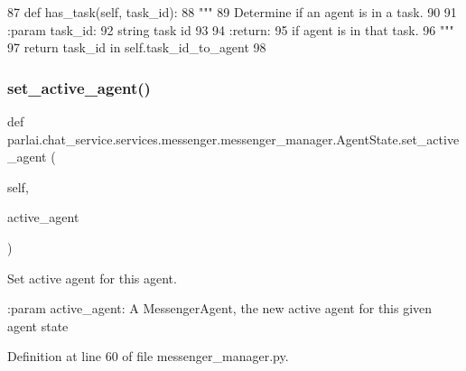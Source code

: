 \begin{DoxyCode}
87     \textcolor{keyword}{def }has\_task(self, task\_id):
88         \textcolor{stringliteral}{"""}
89 \textcolor{stringliteral}{        Determine if an agent is in a task.}
90 \textcolor{stringliteral}{}
91 \textcolor{stringliteral}{        :param task\_id:}
92 \textcolor{stringliteral}{            string task id}
93 \textcolor{stringliteral}{}
94 \textcolor{stringliteral}{        :return:}
95 \textcolor{stringliteral}{            if agent is in that task.}
96 \textcolor{stringliteral}{        """}
97         \textcolor{keywordflow}{return} task\_id \textcolor{keywordflow}{in} self.task\_id\_to\_agent
98 
\end{DoxyCode}
\mbox{\label{classparlai_1_1chat__service_1_1services_1_1messenger_1_1messenger__manager_1_1AgentState_a33f7fbb94a33fb890c3dcc2b8d38f740}} 
\subsubsection{\texorpdfstring{set\+\_\+active\+\_\+agent()}{set\_active\_agent()}}
{\footnotesize\ttfamily def parlai.\+chat\+\_\+service.\+services.\+messenger.\+messenger\+\_\+manager.\+Agent\+State.\+set\+\_\+active\+\_\+agent (\begin{DoxyParamCaption}\item[{}]{self,  }\item[{}]{active\+\_\+agent }\end{DoxyParamCaption})}

\begin{DoxyVerb}Set active agent for this agent.

:param active_agent:
    A MessengerAgent, the new active agent for this given agent state
\end{DoxyVerb}
 

Definition at line 60 of file messenger\+\_\+manager.\+py.


